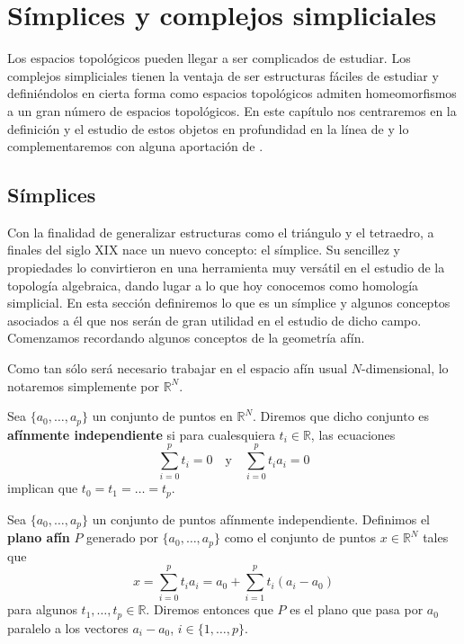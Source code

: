 
\chapter{Símplices y complejos simpliciales}

Los espacios topológicos pueden llegar a ser complicados de estudiar. Los complejos simpliciales tienen la ventaja de ser estructuras fáciles de estudiar y definiéndolos en cierta forma como espacios topológicos admiten homeomorfismos a un gran número de espacios topológicos. En este capítulo nos centraremos en la definición y el estudio de estos objetos en profundidad en la línea de \cite{munkres2018elements} y lo complementaremos con alguna aportación de \cite{lee2010introduction}.

\section{Símplices}

Con la finalidad de generalizar estructuras como el triángulo y el tetraedro, 
a finales del siglo XIX nace un nuevo concepto: el símplice. Su sencillez y 
propiedades lo convirtieron en una herramienta muy versátil en el estudio de la
topología algebraica, dando lugar a lo que hoy conocemos como homología simplicial. 
En esta sección definiremos lo que es un símplice y algunos conceptos asociados a él
que nos serán de gran utilidad en el estudio de dicho campo. Comenzamos recordando algunos conceptos de la geometría afín.

Como tan sólo será necesario trabajar en el espacio afín usual $N$-dimensional, lo notaremos simplemente por $\mathbb{R}^{N}$.

\begin{definicion}
	Sea $\{a_0, \dots, a_p\}$ un conjunto de puntos en $\mathbb{R}^N$. 
	Diremos que dicho conjunto es \textbf{afínmente independiente} si 
	para cualesquiera $t_i \in \mathbb{R}$, las ecuaciones
	\[ \sum_{i=0}^{p}t_i=0 \quad \text{y} \quad \sum_{i=0}^{p}t_ia_i=0 \]
	implican que $t_0 = t_1 = \dots = t_p$.
\end{definicion}

\begin{definicion}
	Sea $\{a_0, \dots, a_p\}$ un conjunto de puntos afínmente independiente. 
	Definimos el \textbf{plano afín} $P$ generado por $\{a_0, \dots, a_p\}$ como
	el conjunto de puntos $x \in \mathbb{R}^N$ tales que
	\[ x = \sum_{i=0}^{p}t_ia_i = a_0 + \sum_{i=1}^{p}t_i(a_i - a_0) \]
	para algunos $t_1, \dots, t_p \in \mathbb{R}$. Diremos entonces que $P$ es el 
	plano que pasa por $a_0$ paralelo a los vectores $a_i - a_0$, $i \in \{1, \dots, p\}$.
\end{definicion}

